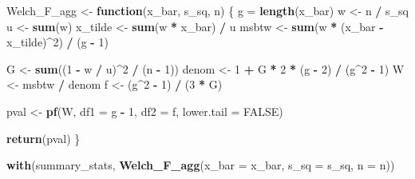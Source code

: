\documentclass[
]{book}
\newenvironment{Shaded}{\begin{snugshade}}{\end{snugshade}}
\newcommand{\AttributeTok}[1]{\textcolor[rgb]{0.13,0.29,0.53}{#1}}
\newcommand{\ConstantTok}[1]{\textcolor[rgb]{0.56,0.35,0.01}{#1}}
\newcommand{\ControlFlowTok}[1]{\textcolor[rgb]{0.13,0.29,0.53}{\textbf{#1}}}
\newcommand{\DecValTok}[1]{\textcolor[rgb]{0.00,0.00,0.81}{#1}}
\newcommand{\FunctionTok}[1]{\textcolor[rgb]{0.13,0.29,0.53}{\textbf{#1}}}
\newcommand{\NormalTok}[1]{#1}
\newcommand{\OtherTok}[1]{\textcolor[rgb]{0.56,0.35,0.01}{#1}}
\newcommand{\SpecialCharTok}[1]{\textcolor[rgb]{0.81,0.36,0.00}{\textbf{#1}}}
\begin{document}
\begin{Shaded}
\begin{Highlighting}[]
\NormalTok{Welch\_F\_agg }\OtherTok{\textless{}{-}} \ControlFlowTok{function}\NormalTok{(x\_bar, s\_sq, n) \{}
\NormalTok{  g }\OtherTok{=} \FunctionTok{length}\NormalTok{(x\_bar)}
\NormalTok{  w }\OtherTok{\textless{}{-}}\NormalTok{ n }\SpecialCharTok{/}\NormalTok{ s\_sq}
\NormalTok{  u }\OtherTok{\textless{}{-}} \FunctionTok{sum}\NormalTok{(w)}
\NormalTok{  x\_tilde }\OtherTok{\textless{}{-}} \FunctionTok{sum}\NormalTok{(w }\SpecialCharTok{*}\NormalTok{ x\_bar) }\SpecialCharTok{/}\NormalTok{ u}
\NormalTok{  msbtw }\OtherTok{\textless{}{-}} \FunctionTok{sum}\NormalTok{(w }\SpecialCharTok{*}\NormalTok{ (x\_bar }\SpecialCharTok{{-}}\NormalTok{ x\_tilde)}\SpecialCharTok{\^{}}\DecValTok{2}\NormalTok{) }\SpecialCharTok{/}\NormalTok{ (g }\SpecialCharTok{{-}} \DecValTok{1}\NormalTok{)}

\NormalTok{  G }\OtherTok{\textless{}{-}} \FunctionTok{sum}\NormalTok{((}\DecValTok{1} \SpecialCharTok{{-}}\NormalTok{ w }\SpecialCharTok{/}\NormalTok{ u)}\SpecialCharTok{\^{}}\DecValTok{2} \SpecialCharTok{/}\NormalTok{ (n }\SpecialCharTok{{-}} \DecValTok{1}\NormalTok{))}
\NormalTok{  denom }\OtherTok{\textless{}{-}} \DecValTok{1} \SpecialCharTok{+}\NormalTok{  G }\SpecialCharTok{*} \DecValTok{2} \SpecialCharTok{*}\NormalTok{ (g }\SpecialCharTok{{-}} \DecValTok{2}\NormalTok{) }\SpecialCharTok{/}\NormalTok{ (g}\SpecialCharTok{\^{}}\DecValTok{2} \SpecialCharTok{{-}} \DecValTok{1}\NormalTok{)}
\NormalTok{  W }\OtherTok{\textless{}{-}}\NormalTok{ msbtw }\SpecialCharTok{/}\NormalTok{ denom}
\NormalTok{  f }\OtherTok{\textless{}{-}}\NormalTok{ (g}\SpecialCharTok{\^{}}\DecValTok{2} \SpecialCharTok{{-}} \DecValTok{1}\NormalTok{) }\SpecialCharTok{/}\NormalTok{ (}\DecValTok{3} \SpecialCharTok{*}\NormalTok{ G)}

\NormalTok{  pval }\OtherTok{\textless{}{-}} \FunctionTok{pf}\NormalTok{(W, }\AttributeTok{df1 =}\NormalTok{ g }\SpecialCharTok{{-}} \DecValTok{1}\NormalTok{, }\AttributeTok{df2 =}\NormalTok{ f, }\AttributeTok{lower.tail =} \ConstantTok{FALSE}\NormalTok{)}

  \FunctionTok{return}\NormalTok{(pval)}
\NormalTok{\}}

\FunctionTok{with}\NormalTok{(summary\_stats, }\FunctionTok{Welch\_F\_agg}\NormalTok{(}\AttributeTok{x\_bar =}\NormalTok{ x\_bar, }\AttributeTok{s\_sq =}\NormalTok{ s\_sq, }\AttributeTok{n =}\NormalTok{ n))}
\end{Highlighting}
\end{Shaded}
\end{document}
